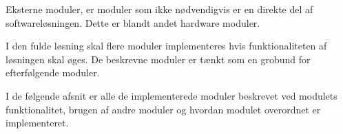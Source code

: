 Eksterne moduler, er moduler som ikke nødvendigvis er en direkte del af softwareløsningen. Dette er blandt andet hardware moduler.

I den fulde løsning skal flere moduler implementeres hvis funktionaliteten af løsningen skal øges. De beskrevne moduler er tænkt som en grobund for efterfølgende moduler.

I de følgende afsnit er alle de implementerede moduler beskrevet ved modulets funktionalitet, brugen af andre moduler og hvordan modulet overordnet er implementeret.









